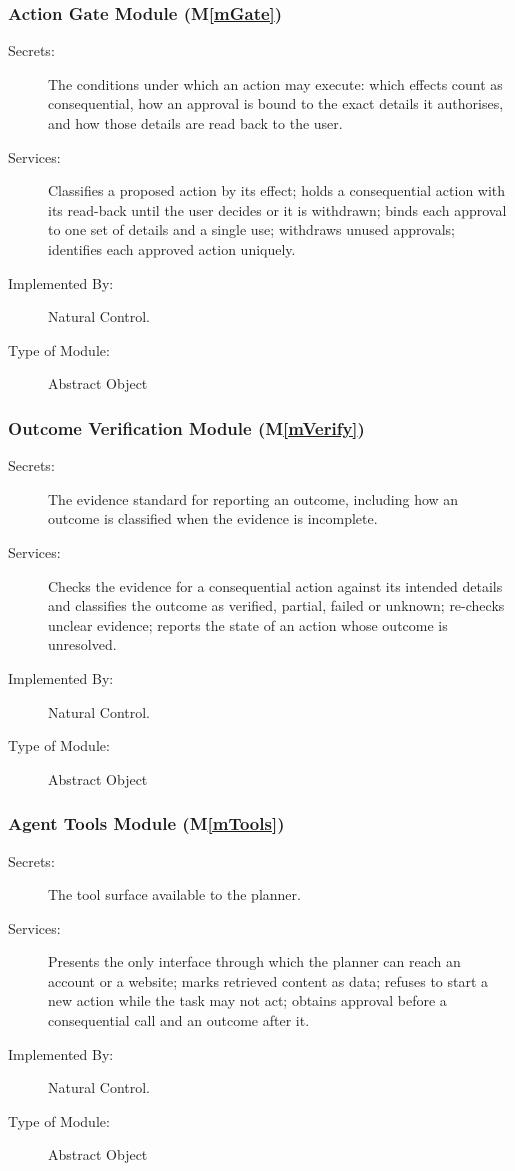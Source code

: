 \documentclass[12pt, titlepage]{article}
\newcommand{\progname}{Natural Control}
\newcommand{\mref}[1]{M\ref{#1}}
\begin{document}
\subsubsection{Action Gate Module (\mref{mGate})}
\begin{description}
\item[Secrets:] The conditions under which an action may execute: which
effects count as consequential, how an approval is bound to the exact details
it authorises, and how those details are read back to the user.
\item[Services:] Classifies a proposed action by its effect; holds a
consequential action with its read-back until the user decides or it is
withdrawn; binds each approval to one set of details and a single use;
withdraws unused approvals; identifies each approved action uniquely.
\item[Implemented By:] \progname{}.
\item[Type of Module:] Abstract Object
\end{description}

\subsubsection{Outcome Verification Module (\mref{mVerify})}
\begin{description}
\item[Secrets:] The evidence standard for reporting an outcome, including how
an outcome is classified when the evidence is incomplete.
\item[Services:] Checks the evidence for a consequential action against its
intended details and classifies the outcome as verified, partial, failed or
unknown; re-checks unclear evidence; reports the state of an action whose
outcome is unresolved.
\item[Implemented By:] \progname{}.
\item[Type of Module:] Abstract Object
\end{description}

\subsubsection{Agent Tools Module (\mref{mTools})}
\begin{description}
\item[Secrets:] The tool surface available to the planner.
\item[Services:] Presents the only interface through which the planner can
reach an account or a website; marks retrieved content as data; refuses to
start a new action while the task may not act; obtains approval before a
consequential call and an outcome after it.
\item[Implemented By:] \progname{}.
\item[Type of Module:] Abstract Object
\end{description}
\end{document}

